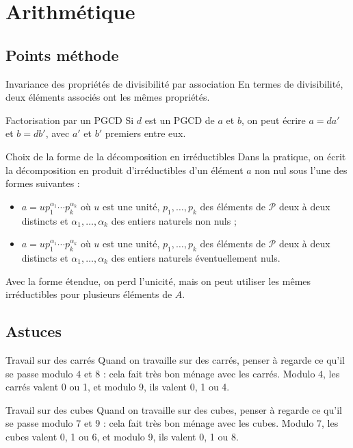 \documentclass[french]{book}
\theoremstyle{plain}
\theoremstyle{definition}
\theoremstyle{remark}
\begin{document}
\chapter{Arithmétique}
\localtableofcontents
\section{Points méthode}
\begin{PM}{Invariance des propriétés de divisibilité par association}
	En termes de divisibilité, deux éléments associés ont les mêmes propriétés.
\end{PM}
\begin{PM}{Factorisation par un PGCD}
	Si $d$ est un PGCD de $a$ et $b$, on peut écrire $a=da'$ et $b=db'$, avec $a'$ et $b'$ premiers entre eux.
\end{PM}
\begin{PM}{Choix de la forme de la décomposition en irréductibles}
	Dans la pratique, on écrit la décomposition en produit d'irréductibles d'un élément $a$ non nul sous l'une des formes suivantes :
	\begin{itemize}
		\item $a=up_1^{\alpha_1}\cdots p_k^{\alpha_k}$ où $u$ est une unité, $p_1,\ldots,p_k$ des éléments de $\mathcal{P}$ deux à deux distincts et $\alpha_1,\ldots,\alpha_k$ des entiers naturels non nuls ;
		\item $a=up_1^{\alpha_1}\cdots p_k^{\alpha_k}$ où $u$ est une unité, $p_1,\ldots,p_k$ des éléments de $\mathcal{P}$ deux à deux distincts et $\alpha_1,\ldots,\alpha_k$ des entiers naturels éventuellement nuls.
	\end{itemize} Avec la forme étendue, on perd l'unicité, mais on peut utiliser les mêmes irréductibles pour plusieurs éléments de $A$.
\end{PM}
\section{Astuces}
\begin{AS}{Travail sur des carrés} Quand on travaille sur des carrés, penser à regarde ce qu'il se passe modulo $4$ et $8$ : cela fait très bon ménage avec les carrés. Modulo $4$, les carrés valent 0 ou 1, et modulo 9, ils valent 0, 1 ou 4.
\end{AS}
\begin{AS}{Travail sur des cubes} Quand on travaille sur des cubes, penser à regarde ce qu'il se passe modulo $7$ et $9$ : cela fait très bon ménage avec les cubes. Modulo $7$, les cubes valent 0, 1 ou 6, et modulo 9, ils valent 0, 1 ou 8.
\end{AS}
\end{document}
